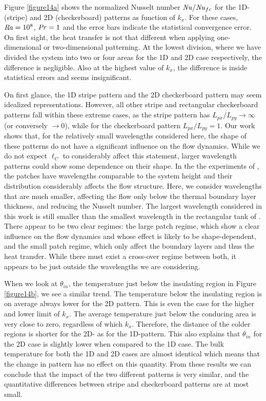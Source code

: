 \documentclass{jfm}
\newcommand\Pran{\mbox{\textit{Pr}}} %
\newcommand\Ray{\mbox{\textit{Ra}}}  %
\newcommand\Nus{\mbox{\textit{Nu}}}  %
\begin{document}
Figure \ref{figure14a} shows the normalized Nusselt number $\Nus/\Nus_{fc}$
for the 1D- (stripe) and 2D (checkerboard) patterns as function of $k_x$.  For
these cases, $\Ray=10^8$, $\Pran=1$ and the error bars indicate the
statistical convergence error.  On first sight, the heat transfer is not that
different when applying one-dimensional or two-dimensional patterning.  At the
lowest division, where we have divided the system into two or four areas for
the 1D and 2D case respectively, the difference is negligible.  Also at the
highest value of $k_x$, the difference is inside statistical errors and seems
insignificant. 


On first glance, the 1D stripe pattern and the 2D checkerboard pattern may
seem idealized representations. However, all other stripe and rectangular
checkerboard patterns fall within these extreme cases, as the stripe pattern
has $L_{px}/L_{py} \to \infty$ (or conversely $\to 0$), while for the
checkerboard pattern $L_{px}/L_{py}=1$.  Our work shows that, for the
relatively small wavelengths considered here, the shape of these patterns do
not have a significant influence on the flow dynamics. While we do not expect
$\ell_C$ to considerably affect this statement, larger wavelength patterns
could show some dependence on their shape. In the the experiments of
\cite{wang17}, the patches have wavelengths comparable to the system height
and their distribution considerably affects the flow structure. Here, we
consider wavelengths that are much smaller, affecting the flow only below the
thermal boundary layer thickness, and reducing the Nusselt number.  The
largest wavelength considered in this work is still smaller than the smallest
wavelength in the rectangular tank of \cite{wang17}.  There appear to be two
clear regimes: the large patch regime, which show a clear influence on the
flow dynamics and whose effect is likely to be shape-dependent, and the small
patch regime, which only affect the boundary layers and thus the heat
transfer. While there must exist a cross-over regime between both, it appears
to be just outside the wavelengths we are considering. 


When we look at $\theta_{in}$, the temperature just below the insulating
region in Figure \ref{figure14b}, we see a similar trend.  The temperature
below the insulating region is on average always lower for the 2D pattern.
This is even the case for the higher and lower limit of $k_x$.  The average
temperature just below the conducing area is very close to zero, regardless of
which $k_x$.  Therefore, the distance of the colder regions is shorter for the
2D- as for the 1D-pattern.  This also explains that $\theta_{in}$ for the 2D
case is slightly lower when compared to the 1D case.  The bulk temperature for
both the 1D and 2D cases are almost identical which means that the change in
pattern has no effect on this quantity.  From these results we can conclude
that the impact of the two different patterns is very similar, and the
quantitative differences between stripe and checkerboard patterns are at most
small.
\end{document}
